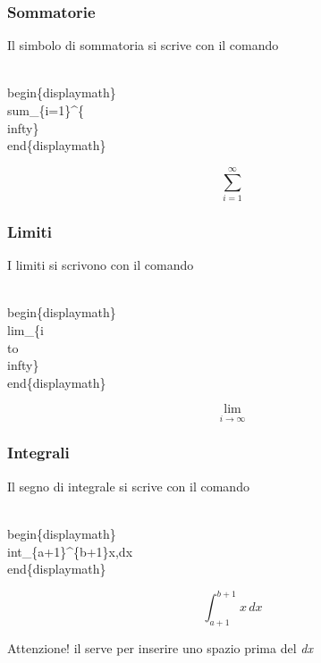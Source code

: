 \documentclass[svgnames,%
	ucs,%
	pdftex]{guitbeamer}
\begin{document}
\begin{frame}
  \frametitle{Sommatorie}
	Il simbolo di sommatoria si scrive con il comando  
 	\begin{LaTeXcode}
		\\begin\{displaymath\}\n
		\hspace*{5ex}\alert{\\sum}\_\{i=1\}\textasciicircum \{\\infty\}\n
		\\end\{displaymath\}
 	\end{LaTeXcode}
	\begin{LaTeXoutput}
		\begin{displaymath}
			\sum_{i=1}^{\infty}
		\end{displaymath}
	\end{LaTeXoutput}
\end{frame}
\begin{frame}
  \frametitle{Limiti}
	I limiti si scrivono con il comando \LCmd{lim}
 	\begin{LaTeXcode}
		\\begin\{displaymath\}\n
		\hspace*{5ex}\alert{\\lim}\_\{i \\to \\infty\}\n
		\\end\{displaymath\}
 	\end{LaTeXcode}
	\begin{LaTeXoutput}
		\begin{displaymath}
			\lim_{i \to \infty}
		\end{displaymath}
	\end{LaTeXoutput}
\end{frame}
\begin{frame}
  \frametitle{Integrali}
	Il segno di integrale si scrive con il comando \\
 	\begin{LaTeXcode}
		\\begin\{displaymath\}\n
		\hspace*{5ex}\alert{\\int}\_\{a+1\}\textasciicircum \{b+1\}x\bs,dx\n
		\\end\{displaymath\}
 	\end{LaTeXcode}
	\begin{LaTeXoutput}
		\begin{displaymath}
			\int_{a+1}^{b+1}x\,dx
		\end{displaymath}
	\end{LaTeXoutput}
	\begin{block}{Attenzione!}
	il \LCmd{,} serve per inserire uno spazio prima del \textrm{\textit{dx}}
	\end{block}
\end{frame}
\end{document}
